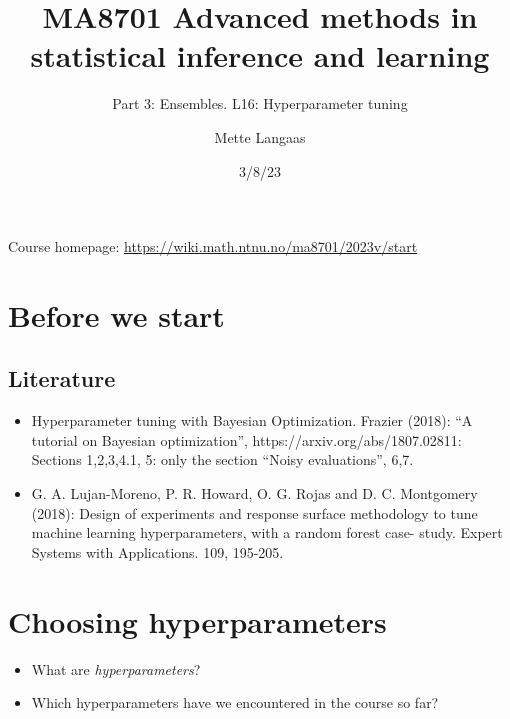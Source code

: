 \documentclass[
  letterpaper,
  DIV=11,
  numbers=noendperiod]{scrartcl}
\title{MA8701 Advanced methods in statistical inference and learning}
\subtitle{Part 3: Ensembles. L16: Hyperparameter tuning}
\author{Mette Langaas}
\date{3/8/23}
\providecommand{\tightlist}{%
  \setlength{\itemsep}{0pt}\setlength{\parskip}{0pt}}\usepackage{longtable,booktabs,array}
\renewcommand*\contentsname{Table of contents}
\newcommand\contentsname{Table of contents}
\begin{document}
\maketitle
\ifdefined\Shaded\renewenvironment{Shaded}{\begin{tcolorbox}[borderline west={3pt}{0pt}{shadecolor}, interior hidden, enhanced, breakable, boxrule=0pt, frame hidden, sharp corners]}{\end{tcolorbox}}\fi

\renewcommand*\contentsname{Table of contents}
{
\hypersetup{linkcolor=}
\setcounter{tocdepth}{3}
\tableofcontents
}
Course homepage: \url{https://wiki.math.ntnu.no/ma8701/2023v/start}

\hypertarget{before-we-start}{%
\section{Before we start}\label{before-we-start}}

\hypertarget{literature}{%
\subsection{Literature}\label{literature}}

\begin{itemize}
\item
  Hyperparameter tuning with Bayesian Optimization. Frazier (2018): ``A
  tutorial on Bayesian optimization'', https://arxiv.org/abs/1807.02811:
  Sections 1,2,3,4.1, 5: only the section ``Noisy evaluations'', 6,7.
\item
  G. A. Lujan-Moreno, P. R. Howard, O. G. Rojas and D. C. Montgomery
  (2018): Design of experiments and response surface methodology to tune
  machine learning hyperparameters, with a random forest case- study.
  Expert Systems with Applications. 109, 195-205.
\end{itemize}

\hypertarget{choosing-hyperparameters}{%
\section{Choosing hyperparameters}\label{choosing-hyperparameters}}

\begin{itemize}
\tightlist
\item
  What are \emph{hyperparameters}?
\item
  Which hyperparameters have we encountered in the course so far?
\end{itemize}
\end{document}
